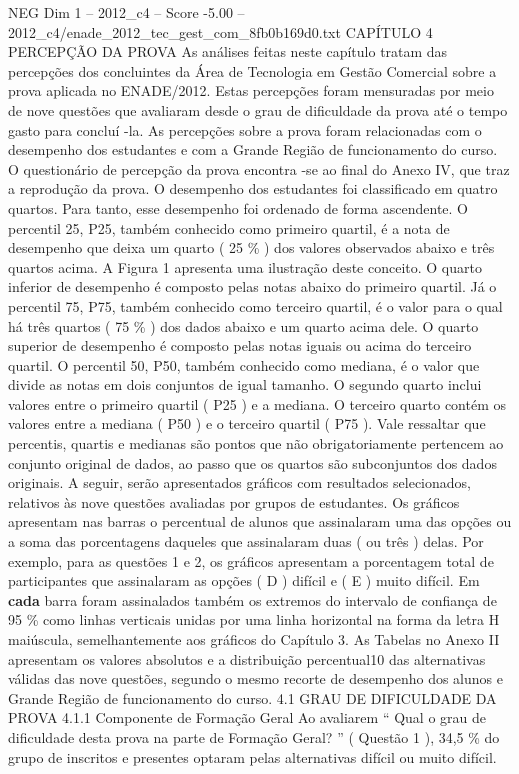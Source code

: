 \begin{textsample}{NEG Dim 1 – 2012\_c4 – Score -5.00 – 2012\_c4/enade\_2012\_tec\_gest\_com\_8fb0b169d0.txt}  \label{ex:f1_neg_074}
CAPÍTULO 4 PERCEPÇÃO DA PROVA As análises feitas neste capítulo tratam das percepções dos concluintes da Área de Tecnologia em Gestão Comercial sobre a prova aplicada no ENADE/2012.
Estas percepções foram mensuradas por meio de nove questões que avaliaram desde o grau de dificuldade da prova até o tempo gasto para concluí -la.
As percepções sobre a prova foram relacionadas com o desempenho dos estudantes e com a Grande Região de funcionamento do curso.
O questionário de percepção da prova encontra -se ao final do Anexo IV, que traz a reprodução da prova.
O desempenho dos estudantes foi classificado em quatro quartos.
Para tanto, esse desempenho foi ordenado de forma ascendente.
O percentil 25, P25, também conhecido como primeiro quartil, é a nota de desempenho que deixa um quarto ( 25 \% ) dos valores observados abaixo e três quartos acima.
A Figura 1 apresenta uma ilustração deste conceito.
O quarto inferior de desempenho é composto pelas notas abaixo do primeiro quartil.
Já o percentil 75, P75, também conhecido como terceiro quartil, é o valor para o qual há três quartos ( 75 \% ) dos dados abaixo e um quarto acima dele.
O quarto superior de desempenho é composto pelas notas iguais ou acima do terceiro quartil.
O percentil 50, P50, também conhecido como mediana, é o valor que divide as notas em dois conjuntos de igual tamanho.
O segundo quarto inclui valores entre o primeiro quartil ( P25 ) e a mediana.
O terceiro quarto contém os valores entre a mediana ( P50 ) e o terceiro quartil ( P75 ).
Vale ressaltar que percentis, quartis e medianas são pontos que não obrigatoriamente pertencem ao conjunto original de dados, ao passo que os quartos são subconjuntos dos dados originais.
A seguir, serão apresentados gráficos com resultados selecionados, relativos às nove questões avaliadas por grupos de estudantes.
Os gráficos apresentam nas barras o percentual de alunos que assinalaram uma das opções ou a soma das porcentagens daqueles que assinalaram duas ( ou três ) delas.
Por exemplo, para as questões 1 e 2, os gráficos apresentam a porcentagem total de participantes que assinalaram as opções ( D ) difícil e ( E ) muito difícil.
Em \textbf{cada} barra foram assinalados também os extremos do intervalo de confiança de 95 \% como linhas verticais unidas por uma linha horizontal na forma da letra H maiúscula, semelhantemente aos gráficos do Capítulo 3.
As Tabelas no Anexo II apresentam os valores absolutos e a distribuição percentual10 das alternativas válidas das nove questões, segundo o mesmo recorte de desempenho dos alunos e Grande Região de funcionamento do curso. 4.1 GRAU DE DIFICULDADE DA PROVA 4.1.1 Componente de Formação Geral Ao avaliarem “ Qual o grau de dificuldade desta prova na parte de Formação Geral? ” ( Questão 1 ), 34,5 \% do grupo de inscritos e presentes optaram pelas alternativas difícil ou muito difícil.

\end{textsample}
